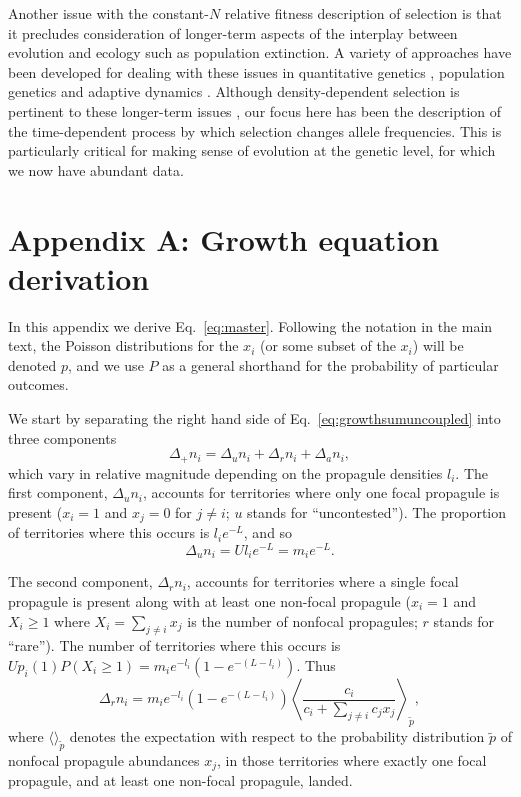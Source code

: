 \documentclass[12pt]{article}
\begin{document}
Another issue with the constant-$N$ relative fitness description of selection is that it precludes consideration of longer-term aspects of the interplay between evolution and ecology such as population extinction. A variety of approaches have been developed for dealing with these issues in quantitative genetics \citep{burger1995evolution,engen_2013}, population genetics \citep{bertram2017predicting} and adaptive dynamics \citep{ferriere2013eco,dieckmann2004adaptive}. Although density-dependent selection is  pertinent to these longer-term issues \citep{travis_2013}, our focus here has been the description of the time-dependent process by which selection changes allele frequencies. This is particularly critical for making sense of evolution at the genetic level, for which we now have abundant data.



 

\section*{Appendix A: Growth equation derivation}

In this appendix we derive Eq.~\eqref{eq:master}. Following the notation in the main text, the Poisson distributions for the $x_i$ (or some subset of the $x_i$) will be denoted $p$, and we use $P$ as a general shorthand for the probability of particular outcomes.

We start by separating the right hand side of Eq.~\eqref{eq:growthsumuncoupled} into three components
\begin{equation}
\Delta_+ n_i = \Delta_u n_i+\Delta_r n_i+\Delta_a n_i,\label{eq:delt_decomp}
\end{equation}
which vary in relative magnitude depending on the propagule densities $l_i$. The first component, $\Delta_u n_i$, accounts for territories where only one focal propagule is present ($x_i=1$ and $x_j=0$ for $j\neq i$; $u$ stands for ``uncontested''). The proportion of territories where this occurs is $l_i e^{-L}$, and so 
\begin{equation}
\Delta_u n_i=Ul_i e^{-L}=m_i e^{-L}.
\end{equation}

The second component, $\Delta_r n_i$, accounts for territories where a single focal propagule is present along with at least one non-focal propagule ($x_i=1$ and $X_i\geq 1$ where $X_i=\sum_{j\neq i} x_j$ is the number of nonfocal propagules; $r$ stands for ``rare''). The number of territories where this occurs is $Up_i(1)P(X_i\geq 1)=m_i e^{-l_i}(1-e^{-(L-l_i)})$. Thus 
\begin{equation}
\Delta_r n_i = m_i e^{-l_i}(1-e^{-(L-l_i)})\left\langle  \frac{c_i}{c_i +\sum_{j\neq i} c_j x_j } \right\rangle_{\tilde{p}},  \label{eq:deltr}
\end{equation}
where $\langle \rangle_{\tilde{p}}$ denotes the expectation with respect to the probability distribution $\tilde{p}$ of nonfocal propagule abundances $x_j$, in those territories where exactly one focal propagule, and at least one non-focal propagule, landed. 
\end{document}
